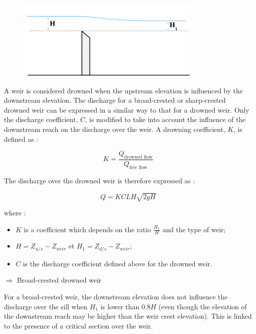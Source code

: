 \begin{figure}[H]
    \begin{center}
     \includegraphics[width=0.8\textwidth]{Figures/Snoy.png}
    \end{center}
\end{figure}

A weir is considered drowned when the upstream elevation is influenced by the downstream elevation. The discharge for a broad-crested or sharp-crested drowned weir can be expressed in a similar way to that for a drowned weir. Only the discharge coefficient, $C$, is modified to take into account the influence of the downstream reach on the discharge over the weir. A drowning coefficient, $K$, is defined as :

\begin{equation}
 K = \frac{Q_{\mbox{drowned flow}}}{Q_{\mbox{free flow}}}
\end{equation}

The discharge over the drowned weir is therefore expressed as :

\begin{equation}
 \label{sny}
 Q = K C L H \sqrt{2 g H}
\end{equation}

where :
\begin{itemize}
 \item $K$ is a coefficient which depends on the ratio $\frac{H_1}{H}$ and the type of weir;
 \item $H=Z_{u/s}-Z_{weir}$ et $H_1 = Z_{d/s}-Z_{weir}$;
 \item $C$ is the discharge coefficient defined above for the drowned weir.
\end{itemize}

$\Longrightarrow$ Broad-crested drowned weir

For a broad-crested weir, the downstream elevation does not influence the discharge over the sill when $H_1$ is lower than $0.8H$ (even though the elevation of the downstream reach may be higher than the weir crest elevation). This is linked to the presence of a critical section over the weir.

